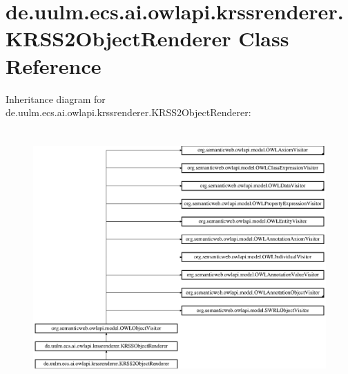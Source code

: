 \hypertarget{classde_1_1uulm_1_1ecs_1_1ai_1_1owlapi_1_1krssrenderer_1_1_k_r_s_s2_object_renderer}{\section{de.\-uulm.\-ecs.\-ai.\-owlapi.\-krssrenderer.\-K\-R\-S\-S2\-Object\-Renderer Class Reference}
\label{classde_1_1uulm_1_1ecs_1_1ai_1_1owlapi_1_1krssrenderer_1_1_k_r_s_s2_object_renderer}
}
Inheritance diagram for de.\-uulm.\-ecs.\-ai.\-owlapi.\-krssrenderer.\-K\-R\-S\-S2\-Object\-Renderer\-:\begin{figure}[H]
\begin{center}
\leavevmode
\includegraphics[height=9.811320cm]{classde_1_1uulm_1_1ecs_1_1ai_1_1owlapi_1_1krssrenderer_1_1_k_r_s_s2_object_renderer}
\end{center}
\end{figure}

